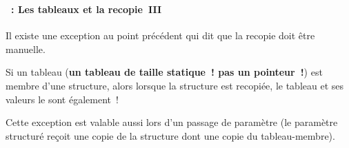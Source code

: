 \begin{frame}
  \frametitle{\secname}
  \framesubtitle{\subsecname~: Les tableaux et la recopie~III}

  Il existe une exception au point précédent qui dit que la recopie doit être manuelle. 
  \vspace{0.5cm}
  \par
  Si un tableau (\textbf{un tableau de taille statique~! pas un pointeur~!}) est membre d'une structure, alors lorsque la structure est
  recopiée, le tableau et ses valeurs le sont également~! 
  \par
  Cette exception est valable aussi lors d'un passage de paramètre (le paramètre structuré reçoit une copie de la structure
  dont une copie du tableau-membre).
\end{frame}

